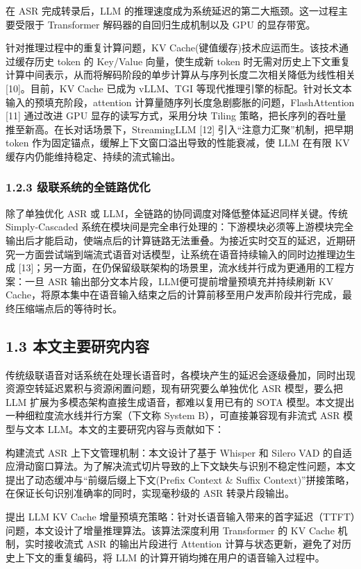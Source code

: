 \documentclass[UTF8,a4paper,12pt]{ctexart}
\begin{document}
在 ASR 完成转录后，LLM 的推理速度成为系统延迟的第二大瓶颈。这一过程主要受限于 Transformer 解码器的自回归生成机制以及 GPU 的显存带宽。

针对推理过程中的重复计算问题，KV Cache(键值缓存)技术应运而生。该技术通过缓存历史 token 的 Key/Value 向量，使生成新 token 时无需对历史上下文重复计算中间表示，从而将解码阶段的单步计算从与序列长度二次相关降低为线性相关 [10]。目前，KV Cache 已成为 vLLM、TGI 等现代推理引擎的标配。针对长文本输入的预填充阶段，attention 计算量随序列长度急剧膨胀的问题，FlashAttention [11] 通过改进 GPU 显存的读写方式，采用分块 Tiling 策略，把长序列的吞吐量推至新高。在长对话场景下，StreamingLLM [12] 引入“注意力汇聚”机制，把早期 token 作为固定锚点，缓解上下文窗口溢出导致的性能衰减，使 LLM 在有限 KV 缓存内仍能维持稳定、持续的流式输出。

\subsubsection*{1.2.3 级联系统的全链路优化}


除了单独优化 ASR 或 LLM，全链路的协同调度对降低整体延迟同样关键。传统 Simply-Cascaded 系统在模块间是完全串行处理的：下游模块必须等上游模块完全输出后才能启动，使端点后的计算链路无法重叠。为接近实时交互的延迟，近期研究一方面尝试端到端流式语音对话模型，让系统在语音持续输入的同时边推理边生成 [13]；另一方面，在仍保留级联架构的场景里，流水线并行成为更通用的工程方案：一旦 ASR 输出部分文本片段，LLM便可提前增量预填充并持续刷新 KV Cache，将原本集中在语音输入结束之后的计算前移至用户发声阶段并行完成，最终压缩端点后的等待时长。

\subsection*{1.3 本文主要研究内容}


传统级联语音对话系统在处理长语音时，各模块产生的延迟会逐级叠加，同时出现资源空转延迟累积与资源闲置问题，现有研究要么单独优化 ASR 模型，要么把 LLM 扩展为多模态架构直接生成语音，都难以复用已有的 SOTA 模型。本文提出一种细粒度流水线并行方案（下文称 System B），可直接兼容现有非流式 ASR 模型与文本 LLM。本文的主要研究内容与贡献如下：  

构建流式 ASR 上下文管理机制：本文设计了基于 Whisper 和 Silero VAD 的自适应滑动窗口算法。为了解决流式切片导致的上下文缺失与识别不稳定性问题，本文提出了动态缓冲与“前缀后缀上下文(Prefix Context \& Suffix Context)”拼接策略，在保证长句识别准确率的同时，实现毫秒级的 ASR 转录片段输出。

提出 LLM KV Cache 增量预填充策略：针对长语音输入带来的首字延迟（TTFT）问题，本文设计了增量推理算法。该算法深度利用 Transformer 的 KV Cache 机制，实时接收流式 ASR 的输出片段进行 Attention 计算与状态更新，避免了对历史上下文的重复编码，将 LLM 的计算开销均摊在用户的语音输入过程中。
\end{document}
